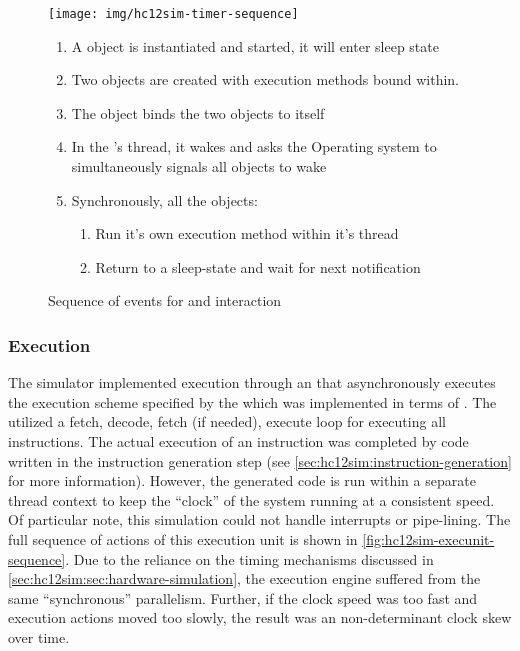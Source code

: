 \begin{figure}[!hp]
    \begin{minipage}{.5\linewidth}
        \centering
        \texttt{[image: img/hc12sim-timer-sequence]} 
    \end{minipage}%
    \begin{minipage}{.5\linewidth}
        \begin{enumerate}
            \item A  object is instantiated and started, it will enter sleep state
            \item Two  objects are created with execution methods bound within.
            \item The  object binds the two  objects to itself
            \item In the 's thread, it wakes and asks the Operating system to simultaneously signals all  objects to wake
            \item Synchronously, all the  objects:
            \begin{enumerate}
                \item Run it's own execution method within it's thread
                \item Return to a sleep-state and wait for next notification
            \end{enumerate}
        \end{enumerate}
    \end{minipage}
    \caption{Sequence of events for  and  interaction \cite{Brightwell2013}} 
    \label{fig:hc12sim-timer-seq}
\end{figure}

\subsubsection*{Execution}

The simulator implemented execution through an  that asynchronously executes the execution scheme specified by the \hcmodel{} \cite[Sec.~4,~p.~47]{hc12Manual2006} which was implemented in terms of \cite[p.~59]{Vahid2002}. The  utilized a fetch, decode, fetch (if needed), execute loop for executing all instructions. The actual execution of an instruction was completed by code written in the instruction generation step (see \cref{sec:hc12sim:instruction-generation} for more information). However, the generated code is run within a separate thread context to keep the ``clock'' of the system running at a consistent speed. Of particular note, this simulation could not handle interrupts or pipe-lining. The full sequence of actions of this execution unit is shown in \cref{fig:hc12sim-execunit-sequence}. Due to the reliance on the timing mechanisms discussed in \cref{sec:hc12sim:sec:hardware-simulation}, the execution engine suffered from the same ``synchronous'' parallelism. Further, if the clock speed was too fast and execution actions moved too slowly, the result was an non-determinant clock skew over time.

